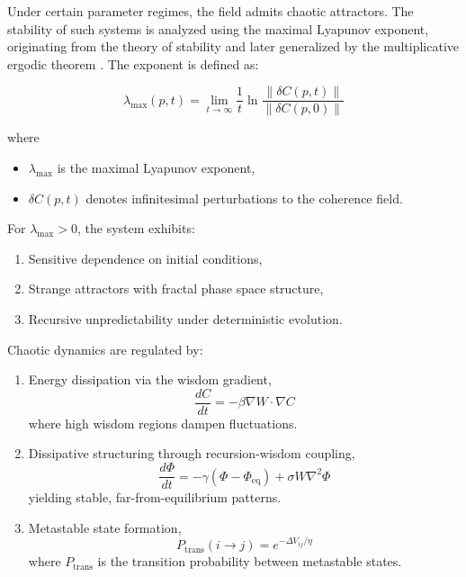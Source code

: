 Under certain parameter regimes, the field admits chaotic attractors. The stability of such systems is analyzed using the maximal Lyapunov exponent, originating from the theory of stability \autocite{Lyapunov1907} and later generalized by the multiplicative ergodic theorem \autocite{Oseledets1968}. The exponent is defined as:

\begin{equation}
\lambda_{\text{max}}(p,t) = \lim_{t \to \infty} \frac{1}{t} \ln \frac{\|\delta C(p,t)\|}{\|\delta C(p,0)\|}
\end{equation}

where

\begin{itemize}
    \item \(\lambda_{\text{max}}\) is the maximal Lyapunov exponent,
    \item \(\delta C(p,t)\) denotes infinitesimal perturbations to the coherence field.
\end{itemize}

For \(\lambda_{\text{max}} > 0\), the system exhibits:

\begin{enumerate}
    \item Sensitive dependence on initial conditions,
    \item Strange attractors with fractal phase space structure,
    \item Recursive unpredictability under deterministic evolution.
\end{enumerate}

Chaotic dynamics are regulated by:

\begin{enumerate}
    \item Energy dissipation via the wisdom gradient,
    \begin{equation}
    \frac{dC}{dt} = -\beta \nabla W \cdot \nabla C
    \end{equation}
    where high wisdom regions dampen fluctuations.
    \item Dissipative structuring through recursion-wisdom coupling,
    \begin{equation}
    \frac{d\Phi}{dt} = -\gamma(\Phi - \Phi_{\text{eq}}) + \sigma W \nabla^2 \Phi
    \end{equation}
    yielding stable, far-from-equilibrium patterns.
    \item Metastable state formation,
    \begin{equation}
    P_{\text{trans}}(i \to j) = e^{-\Delta V_{ij}/\eta}
    \end{equation}
    where \(P_{\text{trans}}\) is the transition probability between metastable states.
\end{enumerate}

